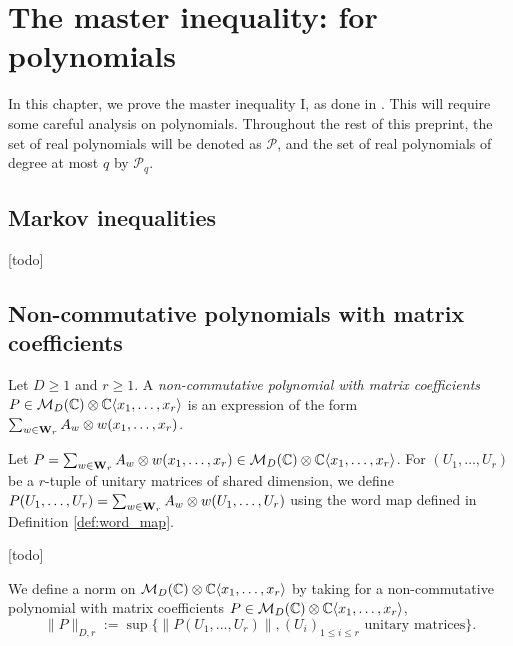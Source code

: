 \chapter{The master inequality: for polynomials}

In this chapter, we prove the master inequality I, as done in \cite[Section 6]{chen2025}.
This will require some careful analysis on polynomials.
Throughout the rest of this preprint, the set of real polynomials will be denoted as $\mathcal{P}$,
and the set of real polynomials of degree at most $q$ by $\mathcal{P}_q$.

\section{Markov inequalities}

\begin{proposition}
  \label{prop:Markov_ineq}
  [todo]
\end{proposition}

\section{Non-commutative polynomials with matrix coefficients}

\begin{definition}
  \label{def:non_comm_poly}
  Let $D \geq 1$ and $r \geq 1$.
  A \emph{non-commutative polynomial with matrix coefficients} $P \in \mathcal{M}_D(\mathbb{C}) \otimes \mathbb{C} \langle x_1, \ldots, x_{r} \rangle$
  is an expression of the form $\sum_{w \in \mathbf{W}_r} A_w \otimes w(x_1, \ldots, x_{r})$.
\end{definition}

\begin{definition}
  \label{def:non_co_map}
  Let $P = \sum_{w \in \mathbf{W}_r} A_w \otimes w(x_1, \ldots, x_{r})\in \mathcal{M}_D(\mathbb{C}) \otimes \mathbb{C} \langle x_1, \ldots, x_{r} \rangle$.
  For $(U_1, \ldots, U_r)$ be a $r$-tuple of unitary matrices of shared dimension,
  we define
  $P(U_1, \ldots, U_r) = \sum_{w \in \mathbf{W}_r} A_w \otimes w(U_1, \ldots, U_r)$
  using the word map defined in Definition \ref{def:word_map}.
\end{definition}

\begin{definition}
  \label{def:self_adjoint_P}
  [todo]
\end{definition}

\begin{definition}
  \label{def:norm_non_comm_poly}
  We define a norm on $\mathcal{M}_D(\mathbb{C}) \otimes \mathbb{C} \langle x_1, \ldots, x_{r} \rangle$ by taking for a non-commutative polynomial
  with matrix coefficients $P \in \mathcal{M}_D(\mathbb{C}) \otimes \mathbb{C} \langle x_1, \ldots, x_{r} \rangle$,
  \begin{equation*}
    \|P\|_{D,r} := \sup \{ \|P(U_1, \ldots, U_r)\|, (U_i)_{1 \leq i \leq r}
    \text{ unitary matrices}\}.
  \end{equation*}
\end{definition}

